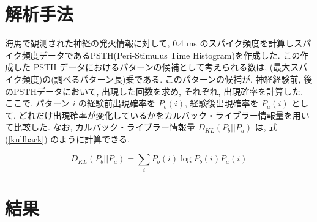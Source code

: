 \documentclass[12pt]{jreport}
\begin{document}
\chapter{解析手法}
海馬で観測された神経の発火情報に対して, 0.4 ms のスパイク頻度を計算しスパイク頻度データであるPSTH(Peri-Stimulus Time Histogram)を作成した.
この作成した PSTH データにおけるパターンの候補として考えられる数は,
(最大スパイク頻度)の(調べるパターン長)乗である.
このパターンの候補が, 神経経験前, 後のPSTHデータにおいて, 出現した回数を求め, それぞれ, 出現確率を計算した.
ここで, パターン $i$ の経験前出現確率を $P_b(i)$, 経験後出現確率を $P_a(i)$ として, どれだけ出現確率が変化しているかをカルバック・ライブラー情報量を用いて比較した. 
なお, カルバック・ライブラー情報量 $D_{KL}(P_b || P_a)$ は, 式(\ref{kullback}) のように計算できる.


\begin{equation}
  \label{kullback}
  D_{KL}(P_b || P_a) = \sum_i P_b(i) \log{P_b(i)}{P_a(i)}
\end{equation}


\chapter{結果}
\end{document}
